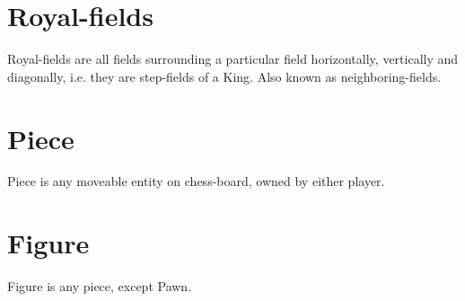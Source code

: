 \section*{Royal-fields}
Royal-fields are all fields surrounding a particular field horizontally,
vertically and diagonally, i.e. they are step-fields of a King. Also known
as neighboring-fields.

\section*{Piece}
Piece is any moveable entity on chess-board, owned by either player.

\section*{Figure}
Figure is any piece, except Pawn.

\clearpage %
